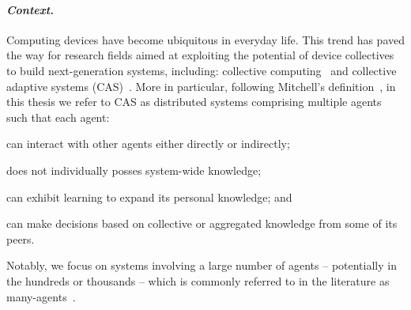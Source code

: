 \documentclass[12pt]{article}
\begin{document}
\paragraph{\emph{Context.}}
Computing devices have become ubiquitous in everyday life.
%
This trend has paved the way for research fields aimed at exploiting
 the potential of device collectives to build next-generation systems, 
 including: collective computing~\cite{DBLP:journals/computer/Abowd16}
 and collective adaptive systems (CAS)~\cite{DBLP:journals/sttt/WirsingJN23,robyphdthesis}.
%
More in particular, following Mitchell's definition~\cite{DBLP:conf/metacognition/Mitchell05}, 
 in this thesis we refer to CAS as distributed systems comprising multiple agents 
 such that each agent:
 \begin{enumerate*}[label=(\roman*)]
	\item can interact with other agents either directly or indirectly;
	\item does not individually posses system-wide knowledge;
	\item can exhibit learning to expand its personal knowledge; and
	\item can make decisions based on collective or aggregated knowledge from some of its peers.
 \end{enumerate*}
%
Notably, we focus on systems involving a large number of agents -- potentially in the hundreds
 or thousands -- which is commonly referred to in the literature 
 as many-agents~\cite{DBLP:phd/ethos/Yang21a}.
\end{document}
